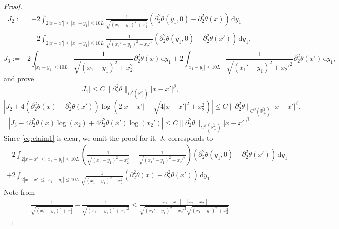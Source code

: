 \documentclass[10pt]{amsart}
\theoremstyle{definition}
\theoremstyle{remark}
\numberwithin{equation}{section}
\newcommand{\ud}{\mathrm{d}}
\newcommand{\rd}{\partial}
\newcommand{\0}{\emptyset}
\newcommand{\ohp}{\overline{\bbR^2_+}}
\newcommand{\tht}{\theta}
\newcommand{\bbR}{\mathbb R}
\begin{document}
\begin{proof}
\begin{equation*}
			\begin{split}
				J_2 := &-2 \int_{2|x-x'| \le |x_1-y_1| \le 10L } \frac{1}{ \sqrt{ (x_1-y_1)^2 + x_2^2 }  } (\rd_{2}^2 \tht(y_1,0) - \rd_{2}^2 \tht(x)) \, \ud y_1 \\
				&+2 \int_{2|x-x'| \le |x_1-y_1| \le 10L } \frac{1}{ \sqrt{ (x_1'-y_1)^2 + x_2'^2 }  } (\rd_{2}^2 \tht(y_1,0) - \rd_{2}^2 \tht(x')) \, \ud y_1,
			\end{split}
		\end{equation*} \begin{equation*}
			J_3 := -2 \int_{|x_1-y_1| \le 10L } \frac{1}{ \sqrt{ (x_1-y_1)^2 + x_2^2 }  } \rd_{2}^2 \tht(x) \, \ud y_1 +2 \int_{|x_1-y_1| \le 10L } \frac{1}{ \sqrt{ (x_1'-y_1)^2 + x_2'^2 }  } \rd_{2}^2 \tht(x') \, \ud y_1,
		\end{equation*} and prove \begin{equation}\label{eq:claim1}
			|J_1| \leq C\| \rd_{2}^2 \tht \|_{C^{\beta}(\ohp)}|x-x'|^{\beta},
		\end{equation} \begin{equation}\label{eq:claim2}
			|J_2 + 4 (\rd_{2}^2 \tht(x) - \rd_{2}^2 \tht(x')) \log (2|x-x'| + \sqrt{4|x-x'|^2 + x_2^2})| \leq C \| \rd_{2}^2 \tht \|_{C^{\beta}(\ohp)} |x-x'|^{\beta},
		\end{equation} \begin{equation}\label{eq:claim3}
			|J_3 - 4 \rd_{2}^2 \tht(x) \log (x_2) + 4 \rd_{2}^2 \tht(x') \log (x_2')| \leq C \| \rd_{2}^2\tht \|_{C^{\beta}(\ohp)} |x-x'|^{\beta}.
		\end{equation} Since \eqref{eq:claim1} is clear, we omit the proof for it. $J_2$ corresponds to \begin{equation*}
			\begin{gathered}
				-2 \int_{2|x-x'| \leq |x_1-y_1| \leq 10L} \left( \frac{1}{ \sqrt{ (x_1-y_1)^2 + x_2^2 }  } - \frac{1}{ \sqrt{ (x_1'-y_1)^2 + x_2'^2 }  } \right) (\rd_{2}^2 \tht(y_1,0) - \rd_{2}^2 \tht(x')) \, \ud y_1 \\
				+2 \int_{2|x-x'| \leq |x_1-y_1| \leq 10L} \frac{1}{ \sqrt{ (x_1-y_1)^2 + x_2^2 }  } (\rd_{2}^2 \tht(x) - \rd_{2}^2 \tht(x')) \, \ud y_1.
			\end{gathered}
		\end{equation*} Note from \begin{equation*}
			\begin{gathered}
				\frac{1}{ \sqrt{ (x_1-y_1)^2 + x_2^2 }  } - \frac{1}{ \sqrt{ (x_1'-y_1)^2 + x_2'^2 }  } 	\leq \frac{|x_1 - x_1'| + |x_2 - x_2'|}{ \sqrt{ (x_1'-y_1)^2 + x_2'^2 } \sqrt{ (x_1-y_1)^2 + x_2^2 } }

\end{gathered}
\end{equation*}
\end{proof}
\end{document}

